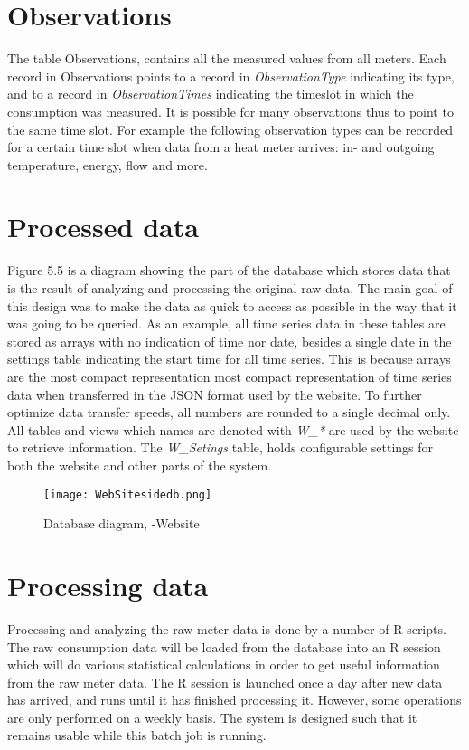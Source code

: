\section*{Observations}
The table Observations, contains all the measured values from all meters. Each record in Observations points to a record in \emph{ObservationType} indicating its type, and to a record in \emph{ObservationTimes} indicating the timeslot in which the consumption was measured. It is possible for many observations thus to point to the same time slot. For example the following observation types can be recorded for a certain time slot when data from a heat meter arrives: in- and outgoing temperature, energy, flow and more.
\section{Processed data}
Figure 5.5 is a diagram showing the part of the database which stores data that is the result of analyzing and processing the original raw data. The main goal of this design was to make the data as quick to access as possible in the way that it was going to be queried. As an example, all time series data in these tables are stored as arrays with no indication of time nor date, besides a single date in the settings table indicating the start time for all time series. This is because arrays are the most compact representation most compact representation of time series data when transferred in the JSON format used by the website. To further optimize data transfer speeds, all numbers are rounded to a single decimal only.
All tables and views which names are denoted with \emph{W\_*} are used by the website to retrieve information. The \emph{W\_Setings} table, holds configurable settings for both the website and other parts of the system.
\begin{figure}
\texttt{[image: WebSitesidedb.png]}
\caption{Database diagram, -Website}
\end{figure}
\section{Processing data}
Processing and analyzing the raw meter data is done by a number of R scripts. The raw consumption data will be loaded from the database into an R session which will do various statistical calculations in order to get useful information from the raw meter data. The R session is launched once a day after new data has arrived, and runs until it has finished processing it. However, some operations are only performed on a weekly basis. The system is designed such that it remains usable while this batch job is running.
